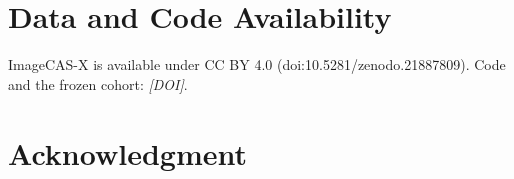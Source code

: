 \documentclass[journal]{IEEEtran}
\begin{document}
\section*{Data and Code Availability}
ImageCAS-X is available under CC BY 4.0 (doi:10.5281/zenodo.21887809). Code and the frozen cohort: \textit{[DOI]}.

\section*{Acknowledgment}



\end{document}
